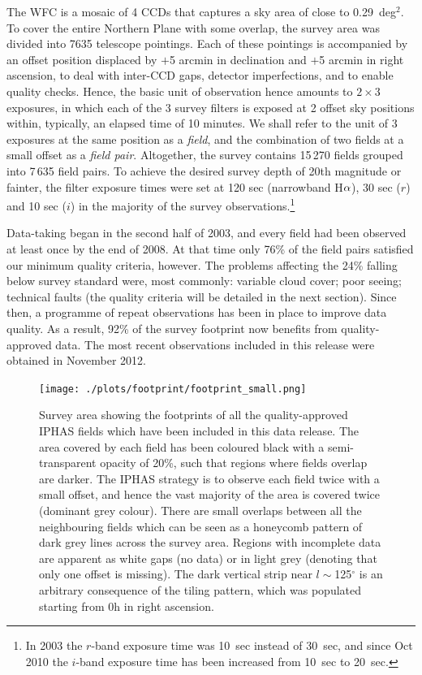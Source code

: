 \documentclass[useAMS,usenatbib]{mn2e}
\def\ha{\mbox{H$\rm \alpha$}}
\def\deg{$^{\circ}$}
\begin{document}
The WFC is a mosaic of 4 CCDs 
that captures a sky area of close to 0.29~deg$^2$.
To cover the entire Northern Plane with some overlap,
the survey area was divided into 7635 telescope pointings.
Each of these pointings is accompanied by an offset position
displaced by $+$5 arcmin in declination 
and $+$5 arcmin in right ascension,
to deal with inter-CCD gaps, detector imperfections,
and to enable quality checks. 
Hence, the basic unit of observation hence
amounts to $2 \times 3$ exposures, 
in which each of the 3 survey filters is exposed at 2 offset sky positions 
within, typically, an elapsed time of 10 minutes.
We shall refer to the unit of 3 exposures at the same position 
as a \emph{field},
and the combination of two fields at a small offset as a \emph{field pair}.
Altogether, the survey contains 15\,270 fields grouped into 7\,635 field pairs.
To achieve the desired survey depth of 20th magnitude or fainter, 
the filter exposure times were set at 120 sec (narrowband \ha), 
30 sec ($r$) and 10 sec ($i$)
in the majority of the survey observations.\footnote{In 2003 
the $r$-band exposure time was 10~sec instead of 30~sec,
and since Oct 2010 the $i$-band exposure time 
has been increased from 10~sec to 20~sec.}

Data-taking began in the second half of 2003, 
and every field had been observed at least once by the end of 2008.
At that time only 76\% of the field pairs 
satisfied our minimum quality criteria, however.  The problems affecting
the 24\% falling below survey standard were, most commonly: variable cloud cover; 
poor seeing; technical faults (the quality criteria will be detailed in the 
next section). 
Since then, a programme of repeat observations has been in place 
to improve data quality. 
As a result, 92\% of the survey footprint
now benefits from quality-approved data.
The most recent observations included in this release
were obtained in November 2012.

\begin{figure}
        \texttt{[image: ./plots/footprint/footprint\_small.png]}
        \caption{Survey area showing the footprints
        of all the quality-approved IPHAS fields
        which have been included in this data release.
        The area covered by each field has been coloured black
        with a semi-transparent opacity of 20\%,
        such that regions where fields overlap are darker.
        The IPHAS strategy is to observe each field twice
        with a small offset,
        and hence the vast majority of the area 
        is covered twice (dominant grey colour).
        There are small overlaps between all the neighbouring fields
        which can be seen as a honeycomb pattern
        of dark grey lines across the survey area.
        Regions with incomplete data are apparent as white gaps (no data) 
        or in light grey (denoting that only one offset is missing).
        The dark vertical strip near $l \sim$125\deg
        is an arbitrary consequence of the tiling pattern,
        which was populated starting from 0h in right ascension.}
        \label{fig:footprint}
\end{figure}
\end{document}
